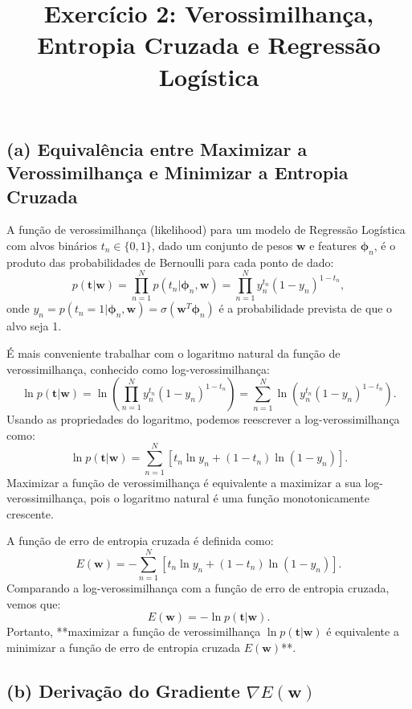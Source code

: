 \documentclass{article}
\title{Exercício 2: Verossimilhança, Entropia Cruzada e Regressão Logística}
\author{}
\date{}
\begin{document}
\maketitle

\section*{}

\subsection*{(a) Equivalência entre Maximizar a Verossimilhança e Minimizar a Entropia Cruzada}

A função de verossimilhança (likelihood) para um modelo de Regressão Logística com alvos binários $t_n \in \{0, 1\}$, dado um conjunto de pesos $\mathbf{w}$ e features $\boldsymbol{\phi}_n$, é o produto das probabilidades de Bernoulli para cada ponto de dado:
\[
p(\mathbf{t}|\mathbf{w}) = \prod_{n=1}^{N} p(t_n|\boldsymbol{\phi}_n, \mathbf{w}) = \prod_{n=1}^{N} y_n^{t_n} (1 - y_n)^{1 - t_n},
\]
onde $y_n = p(t_n = 1|\boldsymbol{\phi}_n, \mathbf{w}) = \sigma(\mathbf{w}^T \boldsymbol{\phi}_n)$ é a probabilidade prevista de que o alvo seja 1.

É mais conveniente trabalhar com o logaritmo natural da função de verossimilhança, conhecido como log-verossimilhança:
\[
\ln p(\mathbf{t}|\mathbf{w}) = \ln \left( \prod_{n=1}^{N} y_n^{t_n} (1 - y_n)^{1 - t_n} \right) = \sum_{n=1}^{N} \ln \left( y_n^{t_n} (1 - y_n)^{1 - t_n} \right).
\]
Usando as propriedades do logaritmo, podemos reescrever a log-verossimilhança como:
\[
\ln p(\mathbf{t}|\mathbf{w}) = \sum_{n=1}^{N} \left[ t_n \ln y_n + (1 - t_n) \ln(1 - y_n) \right].
\]
Maximizar a função de verossimilhança é equivalente a maximizar a sua log-verossimilhança, pois o logaritmo natural é uma função monotonicamente crescente.

A função de erro de entropia cruzada é definida como:
\[
E(\mathbf{w}) = -\sum_{n=1}^{N} \left[ t_n \ln y_n + (1 - t_n) \ln(1 - y_n) \right].
\]
Comparando a log-verossimilhança com a função de erro de entropia cruzada, vemos que:
\[
E(\mathbf{w}) = -\ln p(\mathbf{t}|\mathbf{w}).
\]
Portanto, **maximizar a função de verossimilhança $\ln p(\mathbf{t}|\mathbf{w})$ é equivalente a minimizar a função de erro de entropia cruzada $E(\mathbf{w})$**.

\subsection*{(b) Derivação do Gradiente $\nabla E(\mathbf{w})$}
\end{document}
